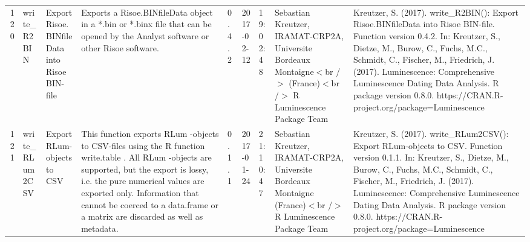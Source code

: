 \begin{table}[ht]
\begin{tabular}{rllllllll}
 \\ 
  120 & write\_R2BIN & Export Risoe.BINfileData into Risoe BIN-file & Exports a Risoe.BINfileData object in a *.bin or *.binx file that can be opened by the Analyst software or other Risoe software. & 0.4.2 & 2017-02-12 & 19:02:48
 & Sebastian Kreutzer, IRAMAT-CRP2A, Universite Bordeaux Montaigne$<$br /$>$ (France)$<$br /$>$  R Luminescence Package Team & Kreutzer, S. (2017). write\_R2BIN(): Export Risoe.BINfileData into Risoe BIN-file. Function version 0.4.2. In: Kreutzer, S., Dietze, M., Burow, C., Fuchs, M.C., Schmidt, C., Fischer, M., Friedrich, J. (2017). Luminescence: Comprehensive Luminescence Dating Data Analysis. R package version 0.8.0. https://CRAN.R-project.org/package=Luminescence
 \\ 
  121 & write\_RLum2CSV & Export RLum-objects to CSV & This function exports  RLum -objects to CSV-files using the R function write.table . All  RLum -objects are supported, but the export is lossy, i.e. the pure numerical values are exported only. Information that cannot be coerced to a  data.frame  or a  matrix  are discarded as well as metadata. & 0.1.1 & 2017-01-24 & 21:10:47
 & Sebastian Kreutzer, IRAMAT-CRP2A, Universite Bordeaux Montaigne (France)$<$br /$>$  R Luminescence Package Team & Kreutzer, S. (2017). write\_RLum2CSV(): Export RLum-objects to CSV. Function version 0.1.1. In: Kreutzer, S., Dietze, M., Burow, C., Fuchs, M.C., Schmidt, C., Fischer, M., Friedrich, J. (2017). Luminescence: Comprehensive Luminescence Dating Data Analysis. R package version 0.8.0. https://CRAN.R-project.org/package=Luminescence
 \\ 
   \hline
\end{tabular}
\end{table}

